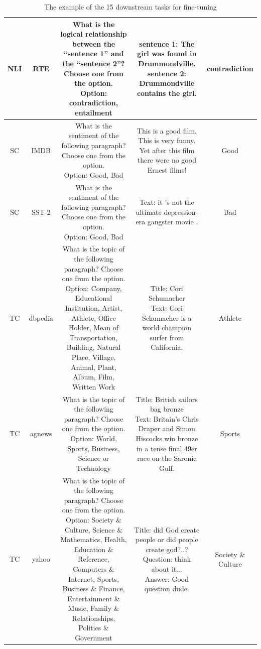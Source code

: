 \begin{table}[htbp]
{\begin{tabular}{c|c|c|c|c}
\midrule
NLI & RTE & \parbox{5cm}{What is the logical relationship between the ``sentence 1'' and the ``sentence 2''? Choose one from the option.\\Option: contradiction, entailment} & \parbox{5cm}{sentence 1: The girl was found in Drummondville.\\sentence 2: Drummondville contains the girl.} & contradiction \\
\midrule
SC & IMDB & \parbox{5cm}{What is the sentiment of the following paragraph? Choose one from the option.\\Option: Good, Bad} & \parbox{5cm}{This is a good film. This is very funny. Yet after this film there were no good Ernest films!} & Good \\
\midrule
SC & SST-2 & \parbox{5cm}{What is the sentiment of the following paragraph? Choose one from the option.\\Option: Good, Bad} & \parbox{5cm}{Text: it 's not the ultimate depression-era gangster movie .} & Bad \\
\midrule
TC & dbpedia & \parbox{5cm}{What is the topic of the following paragraph? Choose one from the option.\\Option: Company, Educational Institution, Artist, Athlete, Office Holder, Mean of Transportation, Building, Natural Place, Village, Animal, Plant, Album, Film, Written Work} & \parbox{5cm}{Title: Cori Schumacher\\Text:  Cori Schumacher is a world champion surfer from California.} & Athlete \\
\midrule
TC & agnews & \parbox{5cm}{What is the topic of the following paragraph? Choose one from the option.\\Option: World, Sports, Business, Science or Technology} & \parbox{5cm}{Title: British sailors bag bronze\\Text: Britain's Chris Draper and Simon Hiscocks win bronze in a tense final 49er race on the Saronic Gulf.} & Sports \\
\midrule
TC & yahoo & \parbox{5cm}{What is the topic of the following paragraph? Choose one from the option.\\Option: Society \& Culture, Science \& Mathematics, Health, Education \& Reference, Computers \& Internet, Sports, Business \& Finance, Entertainment \& Music, Family \& Relationships, Politics \& Government} & \parbox{5cm}{Title: did God create people or did people create god?..?\\Question: think about it...\\Answer: Good question dude.} & Society \& Culture \\
\bottomrule
\end{tabular}

}
\caption{The example of the 15 downstream tasks for fine-tuning}
\label{tab:detailed_tasks1}
\end{table}

